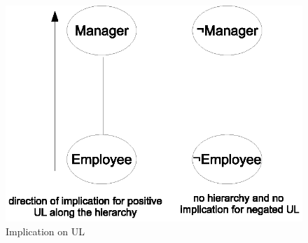
 	\begin{figure}
 		\centering
 		\includegraphics[width=.4\textwidth]{ul-implication}
 		\caption{Implication on UL}
 		\label{fig:ul-implication}
 	\end{figure}